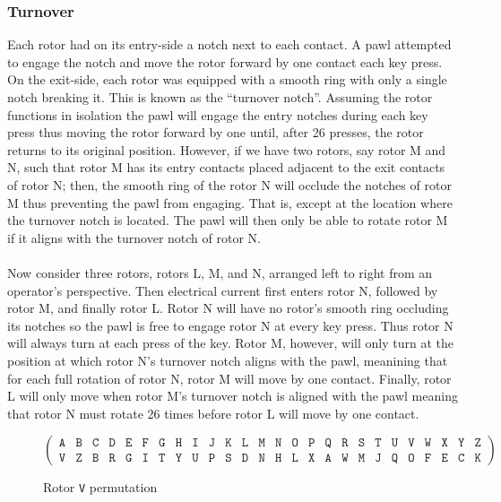 \subsubsection{Turnover}
Each rotor had on its entry-side a notch next to each contact. A pawl
attempted to engage
the notch and move the rotor forward by one contact each key press.
On the exit-side, each
rotor was equipped with a smooth ring with only a single notch
breaking it. This is known as the ``turnover notch''. Assuming the
rotor functions in isolation the pawl will engage the entry notches
during each key press thus moving the rotor forward by one until,
after 26 presses, the rotor returns to its original position.
However, if we have two rotors, say rotor M and N, such that rotor M
has its entry contacts placed adjacent to the exit contacts of rotor
N; then, the smooth ring of the rotor N will occlude the notches of
rotor M thus preventing the pawl from engaging. That is, except at
the location where the turnover notch is located. The pawl will then
only be able to rotate rotor M if it aligns with the turnover notch of rotor N.
\\\\Now consider three rotors, rotors L, M, and N, arranged left to
right from an operator's perspective. Then electrical current first
enters rotor N, followed by rotor M, and finally rotor L. Rotor N
will have no rotor's smooth ring occluding its notches so the pawl is
free to engage rotor N at every key press. Thus rotor N will always
turn at each press of the key. Rotor M, however, will only turn at
the position at which rotor N's turnover notch aligns with the pawl,
meanining that for each full rotation of rotor N, rotor M will move
by one contact. Finally, rotor L will only move when rotor M's
turnover notch is aligned with the pawl meaning that rotor N must
rotate 26 times before rotor L will move by one contact.

\begin{center}
	\begin{figure}[h]
		\[
			\left(
			\begin{array}{llllllllllllllllllllllllll}
					\texttt{A} & \texttt{B} & \texttt{C} & \texttt{D} &
					\texttt{E} & \texttt{F} & \texttt{G} & \texttt{H} &
					\texttt{I} & \texttt{J} & \texttt{K} & \texttt{L} &
					\texttt{M} & \texttt{N} & \texttt{O} & \texttt{P} &
					\texttt{Q} & \texttt{R} & \texttt{S} & \texttt{T} &
					\texttt{U} & \texttt{V} & \texttt{W} & \texttt{X} &
					\texttt{Y} & \texttt{Z}                             \\
					\texttt{V} & \texttt{Z} & \texttt{B} & \texttt{R} &
					\texttt{G} & \texttt{I} & \texttt{T} & \texttt{Y} &
					\texttt{U} & \texttt{P} & \texttt{S} & \texttt{D} &
					\texttt{N} & \texttt{H} & \texttt{L} & \texttt{X} &
					\texttt{A} & \texttt{W} & \texttt{M} & \texttt{J} &
					\texttt{Q} & \texttt{O} & \texttt{F} & \texttt{E} &
					\texttt{C} & \texttt{K}
				\end{array}
			\right)
		\]
		\caption{Rotor \texttt{V} permutation}
		\label{fig:rotor_v_wiring}
	\end{figure}
\end{center}

